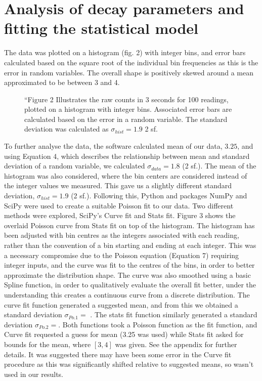 \documentclass[11pt]{article}
\begin{document}
\section{Analysis of decay parameters and fitting the statistical model}
The data was plotted on a histogram (fig. 2) with integer bins, and error bars calculated based on the square root of the individual bin frequencies as this is the error in random variables.  The overall shape is positively skewed around a mean approximated to be between 3 and 4.\\
       \begin{figure}[]
        \begin{center}
            \def\svgwidth{\columnwidth}
            
             \caption{“Figure 2 Illustrates the raw counts in 3 seconds for 100 readings, plotted on a histogram with integer bins. Associated error bars are calculated based on the error in a random variable. The standard deviation was calculated as $\sigma_{hist} = 1.9$ 2 sf.}
             \label{fig:experimental results 1}
        \end{center}
    \end{figure}
To further analyse the data, the software calculated mean of our data, $3.25$, and using Equation 4, which describes the relationship between mean and standard deviation of a random variable, we calculated  $\sigma_{data} = 1.8$  (2 sf.).  The mean of the histogram was also considered, where the bin centers are considered instead of the integer values we measured. This gave us a slightly different standard deviation, $\sigma_{hist} = 1.9$ (2 sf.). 
Following this, Python and packages NumPy and SciPy were used to create a suitable Poisson fit to our data. Two different methods were explored, SciPy's Curve fit and Stats fit. 
Figure 3 shows the overlaid Poisson curve from Stats fit on top of the histogram. The histogram has been adjusted with bin centres as the integers associated with each reading, rather than the convention of a bin starting and ending at each integer. This was a necessary compromise due to the Poisson equation (Equation 7) requiring integer inputs, and the curve was fit to the centres of the bins, in order to better approximate the distribution shape. The curve was also smoothed using a basic Spline function, in order to qualitatively evaluate the overall fit better, under the understanding this creates a continuous curve from a discrete distribution.
The curve fit function generated a suggested mean, and from this we obtained a standard deviation $\sigma_{Po.1} =$ . The stats fit function similarly generated a standard deviation $\sigma_{Po.2} =$. Both functions took a Poisson function as the fit function, and Curve fit requested a guess for mean (3.25 was used) while Stats fit asked for bounds for the mean, where $[3,4]$ was given. See the appendix for further details. It was suggested there may have been some error in the Curve fit procedure as this was significantly shifted relative to suggested means, so wasn't used in our results. 
\end{document}
